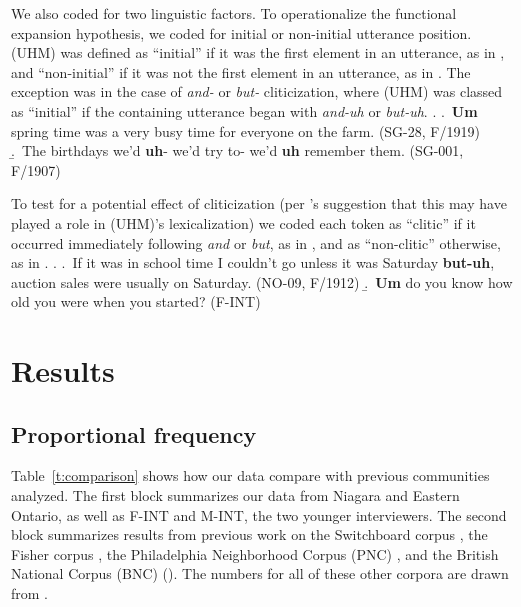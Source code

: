 \documentclass[11pt]{article}
\begin{document}
We also coded for two linguistic factors.
To operationalize the functional expansion hypothesis, we coded for initial or
non-initial utterance position.
(UHM) was defined as ``initial'' if it was the first element in an utterance,
as in \Next[a], and ``non-initial'' if it was not the first element in an
utterance, as in \Next[b].
The exception was in the case of \emph{and-} or \emph{but-} cliticization, where
(UHM) was classed as ``initial'' if the containing utterance began with
\emph{and-uh} or \emph{but-uh}.
\ex.
\a.~\textbf{Um} spring time was a very busy time for everyone on the farm.
(SG-28, F/1919)
\b.~The birthdays we'd \textbf{uh}- we'd try to- we'd \textbf{uh} remember them.
(SG-001, F/1907)


To test for a potential effect of cliticization (per \citeauthor{tottie2017}'s
\citeyear{tottie2017} suggestion that this may have played a role in (UHM)'s
lexicalization) we coded each token as ``clitic'' if it occurred immediately
following \emph{and} or \emph{but}, as in \Next[a], and as ``non-clitic''
otherwise, as in \Next[b].
\ex.
\a.~If it was in school time I couldn't go unless it was Saturday
\textbf{but-uh}, auction sales were usually on Saturday. \hfill (NO-09, F/1912)
\b.~\textbf{Um} do you know how old you were when you started? \hfill (F-INT)

\section{Results}

\subsection{Proportional frequency}

Table~\ref{t:comparison} shows how our data compare with previous communities
analyzed.
The first block summarizes our data from Niagara and Eastern Ontario, as well as
F-INT and M-INT, the two younger interviewers.
The second block summarizes results from previous work on the Switchboard corpus
\parencite{switchboard}, the Fisher corpus \parencite{fisher}, the Philadelphia
Neighborhood Corpus (PNC) \parencite{labovrosenfelder2011}, and the British
National Corpus (BNC) (\citeyear{bnc}).
The numbers for all of these other corpora are drawn from
\textcite{wielingetal2016}.
\end{document}
